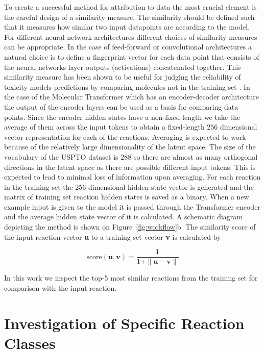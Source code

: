 To create a successful method for attribution to data the most crucial element is the careful design of a similarity measure. The similarity should be defined such that it measures how similar two input datapoints are according to the model. For different neural network architectures different choices of similarity measures can be appropriate. In the case of feed-forward or convolutional architectures a natural choice is to define a fingerprint vector for each data point that consists of the neural networks layer outputs (activations) concatenated together. This similarity measure has been shown to be useful for judging the reliability of toxicity models predictions by comparing molecules not in the training set \cite{Allen2020}. In the case of the Molecular Transformer which has an encoder-decoder architecture the output of the encoder layers can be used as a basis for comparing data points. Since the encoder hidden states have a non-fixed length we take the average of them across the input tokens to obtain a fixed-length $256$ dimensional vector representation for each of the reactions. Averaging is expected to work because of the relatively large dimensionality of the latent space. The size of the vocabulary of the USPTO dataset is 288 so there are almost as many orthogonal directions in the latent space as there are possible different input tokens. This is expected to lead to minimal loss of information upon averaging. For each reaction in the training set the 256 dimensional hidden state vector is generated and the matrix of training set reaction hidden states is saved as a binary. When a new example input is given to the model it is passed through the Transformer encoder and the average hidden state vector of it is calculated. A schematic diagram depicting the method is shown on Figure~\ref{fig:workflow}b. The similarity score of the input reaction vector \textbf{u} to a training set vector \textbf{v} is calculated by

\begin{equation}
    \textrm{score}(\textbf{u},\textbf{v}) = \frac{1}{1 + \|\textbf{u} - \textbf{v} \|}
\end{equation}

In this work we inspect the top-5 most similar reactions from the training set for comparison with the input reaction.

\section{Investigation of Specific Reaction Classes}

